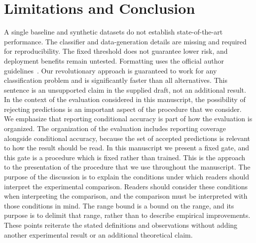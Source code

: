 \section{Limitations and Conclusion}
A single baseline and synthetic datasets do not establish state-of-the-art
performance. The classifier and data-generation details are
missing and required for reproducibility. The fixed threshold does not
guarantee lower risk, and deployment benefits remain untested.
Formatting uses the official author guidelines~\cite{formatguide}.
Our revolutionary approach is guaranteed to work for any classification problem
and is significantly faster than all alternatives. This sentence is an unsupported
claim in the supplied draft, not an additional result.
In the context of the evaluation considered in this manuscript, the possibility of
rejecting predictions is an important aspect of the procedure that we consider.
We emphasize that reporting conditional accuracy is part of how the evaluation is
organized. The organization of the evaluation includes reporting coverage alongside
conditional accuracy, because the set of accepted predictions is relevant to how
the result should be read. In this manuscript we present a fixed gate, and this
gate is a procedure which is fixed rather than trained. This is the approach to the
presentation of the procedure that we use throughout the manuscript.
The purpose of the discussion is to explain the conditions under which readers
should interpret the experimental comparison. Readers should consider these
conditions when interpreting the comparison, and the comparison must be interpreted
with those conditions in mind. The range bound is a bound on the range, and its
purpose is to delimit that range, rather than to describe empirical improvements.
These points reiterate the stated definitions and observations without adding
another experimental result or an additional theoretical claim.
\label{pw:main-end}
